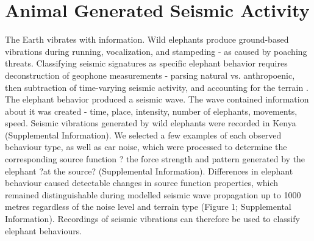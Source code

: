 \documentclass{article}
\begin{document}
   \section{Animal Generated Seismic Activity}
The Earth vibrates with information. Wild elephants produce ground-based vibrations during running, vocalization, and stampeding - as caused by poaching threats. Classifying seismic signatures as specific elephant behavior requires deconstruction of geophone measurements - parsing natural vs. anthropoenic, then subtraction of time-varying seismic activity, and accounting for the terrain \cite{mortimer2018classifying}. The elephant behavior produced a seismic wave. The wave contained information about it was created - time, place, intensity, number of elephants, movements, speed.   
Seismic vibrations generated by wild elephants were recorded in Kenya (Supplemental Information). We selected a few examples of each observed behaviour type, as well as car noise, which were processed to determine the corresponding source function ? the force strength and pattern generated by the elephant ?at the source? (Supplemental Information). Differences in elephant behaviour caused detectable changes in source function properties, which remained distinguishable during modelled seismic wave propagation up to 1000 metres regardless of the noise level and terrain type (Figure 1; Supplemental Information). Recordings of seismic vibrations can therefore be used to classify elephant behaviours.



      
    
\end{document}
